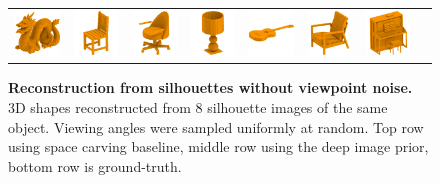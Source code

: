 \begin{figure}[t]
\begin{tabular}{cccccccc}
\includegraphics[width=.14\linewidth]{dsp/figs/dragon.png} &
\includegraphics[width=.14\linewidth]{dsp/figs/chair_0013} &
\includegraphics[width=.14\linewidth]{dsp/figs/chair_0200.png} &
\includegraphics[width=.14\linewidth]{dsp/figs/lamp_0050.png} &
\includegraphics[width=.14\linewidth]{dsp/figs/guitar_0100.png} &
\includegraphics[width=.14\linewidth]{dsp/figs/chair_0011.png} &
\includegraphics[width=.14\linewidth]{dsp/figs/piano_0050.png} \\
\end{tabular}
    \caption{\small \label{fig:recs} \textbf{Reconstruction from silhouettes without viewpoint noise.}
		3D shapes reconstructed from 8 silhouette images of the same object.
		Viewing angles were sampled uniformly at random.
		Top row using space carving baseline, middle row using the deep image prior, bottom row is ground-truth.
    }
\end{figure}

